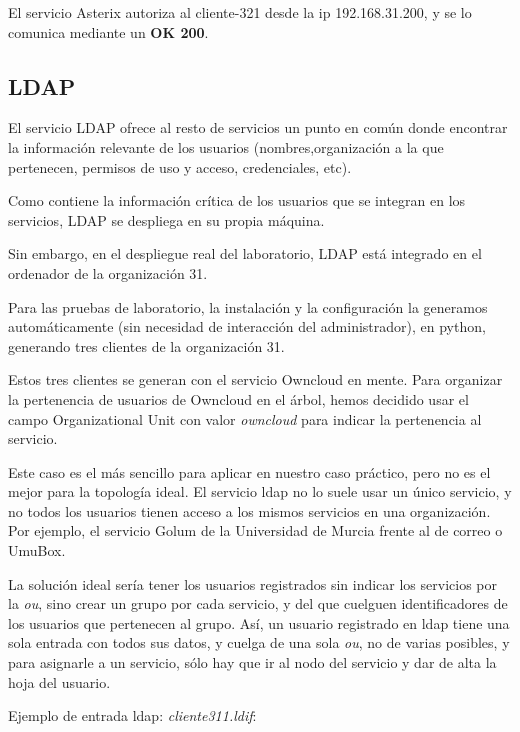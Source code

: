 \documentclass[]{article}
\begin{document}
El servicio Asterix autoriza al cliente-321 desde la ip 192.168.31.200, y se lo comunica mediante un \textbf{OK 200}.

\subsection{LDAP}
El servicio LDAP ofrece al resto de servicios un punto en común donde encontrar la información relevante de los usuarios (nombres,organización a la que pertenecen, permisos de uso y acceso, credenciales, etc).

Como contiene la información crítica de los usuarios que se integran en los servicios, LDAP se despliega en su propia máquina.

Sin embargo, en el despliegue real del laboratorio, LDAP está integrado en el ordenador de la organización 31.

Para las pruebas de laboratorio, la instalación y la configuración la generamos automáticamente (sin necesidad de interacción del administrador), en python, generando tres clientes de la organización 31.

Estos tres clientes se generan con el servicio Owncloud en mente. Para organizar la pertenencia de usuarios de Owncloud en el árbol, hemos decidido usar el campo Organizational Unit con valor \textit{owncloud} para indicar la pertenencia al servicio.
                                                                                                                                                                                                                                                                    
Este caso es el más sencillo para aplicar en nuestro caso práctico, pero no es el mejor para la topología ideal. El servicio ldap no lo suele usar un único servicio, y no todos los usuarios tienen acceso a los mismos servicios en una organización. Por ejemplo, el servicio Golum de la Universidad de Murcia frente al de correo o UmuBox.

La solución ideal sería tener los usuarios registrados sin indicar los servicios por la \textit{ou}, sino crear un grupo por cada servicio, y del que cuelguen identificadores de los usuarios que pertenecen al grupo. Así, un usuario registrado en ldap tiene una sola entrada con todos sus datos, y cuelga de una sola \textit{ou}, no de varias posibles, y para asignarle a un servicio, sólo hay que ir al nodo del servicio y dar de alta la hoja del usuario.

Ejemplo de entrada ldap: \textit{cliente311.ldif}:
\end{document}
